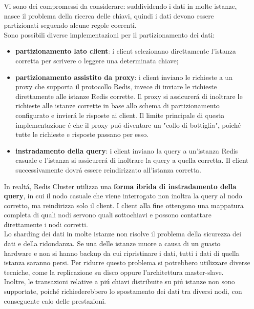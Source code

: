Vi sono dei compromessi da considerare: suddividendo i dati in molte istanze, nasce il problema della
ricerca delle chiavi, quindi i dati devono essere partizionati seguendo alcune regole coerenti.\\
Sono possibili diverse implementazioni per il partizionamento dei dati:
\begin{itemize}
    \item \textbf{partizionamento lato client}: i client selezionano direttamente l'istanza corretta per
    scrivere o leggere una determinata chiave;
    \item \textbf{partizionamento assistito da proxy}: i client inviano le richieste a un proxy che supporta il protocollo Redis,
    invece di inviare le richieste direttamente alle istanze Redis corrette. Il proxy si assicurerá di inoltrare le richieste
    alle istanze corrette in base allo schema di partizionamento configurato e invierá le risposte ai client.
    Il limite principale di questa implementazione é che il proxy puó diventare un "collo di bottiglia", poiché
    tutte le richieste e risposte passano per esso.
    \item \textbf{instradamento della query}: i client inviano la query a un'istanza Redis casuale e l'istanza si
    assicurerá di inoltrare la query a quella corretta. Il client successivamente dovrá essere reindirizzato all'istanza corretta.
\end{itemize}
In realtá, Redis Cluster utilizza una \textbf{forma ibrida di instradamento della query}, in cui il nodo casuale che viene interrogato
non inoltra la query al nodo corretto, ma reindirizza solo il client. I client alla fine ottengono una mappatura completa di quali nodi servono
quali sottochiavi e possono contattare direttamente i nodi corretti.\\


Lo sharding dei dati in molte istanze non risolve il problema della sicurezza dei dati e della ridondanza. Se una delle istanze muore
a causa di un guasto hardware e non si hanno backup da cui ripristinare i dati, tutti i dati di quella istanza saranno persi.
Per ridurre questo problema si potrebbero utilizzare diverse tecniche, come la replicazione su disco oppure l'architettura master-slave.\\
Inoltre, le transazioni relative a piú chiavi distribuite su piú istanze non sono supportate, poiché richiederebbero lo spostamento
dei dati tra diversi nodi, con conseguente calo delle prestazioni.\\






